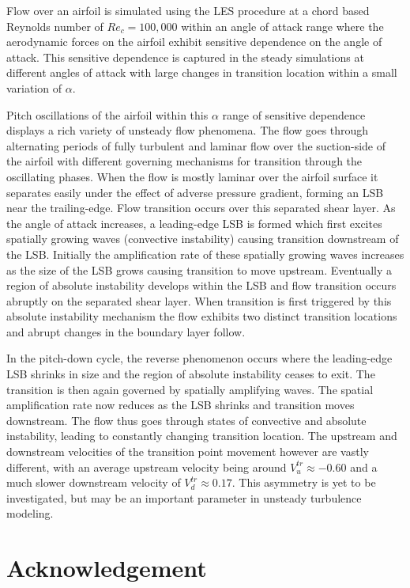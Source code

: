 Flow over an airfoil is simulated using the LES procedure at a chord based Reynolds number of $Re_{c}=100,000$ within an angle of attack range where the aerodynamic forces on the airfoil exhibit sensitive dependence on the angle of attack. This sensitive dependence is captured in the steady simulations at different angles of attack with large changes in transition location within a small variation of $\alpha$.

Pitch oscillations of the airfoil within this $\alpha$ range of sensitive dependence displays a rich variety of unsteady flow phenomena. The flow goes through alternating periods of fully turbulent and laminar flow over the suction-side of the airfoil with different governing mechanisms for transition through the oscillating phases. When the flow is mostly laminar over the airfoil surface it separates easily under the effect of adverse pressure gradient, forming an LSB near the trailing-edge. Flow transition occurs over this separated shear layer. As the angle of attack increases, a leading-edge LSB is formed which first excites spatially growing waves (convective instability) causing transition downstream of the LSB. Initially the amplification rate of these spatially growing waves increases as the size of the LSB grows causing transition to move upstream. Eventually a region of absolute instability develops within the LSB and flow transition occurs abruptly on the separated shear layer. When transition is first triggered by this absolute instability mechanism the flow exhibits two distinct transition locations and abrupt changes in the boundary layer follow.

In the pitch-down cycle, the reverse phenomenon occurs where the leading-edge LSB shrinks in size and the region of absolute instability ceases to exit. The transition is then again governed by spatially amplifying waves. The spatial amplification rate now reduces as the LSB shrinks and transition moves downstream. The flow thus goes through states of convective and absolute instability, leading to constantly changing transition location. The upstream and downstream velocities of the transition point movement however are vastly different, with an average upstream velocity being around $V^{tr}_{u}\approx-0.60$ and a much slower downstream velocity of $V^{tr}_{d}\approx0.17$. This asymmetry is yet to be investigated, but may be an important parameter in unsteady turbulence modeling.

\section*{Acknowledgement} 

